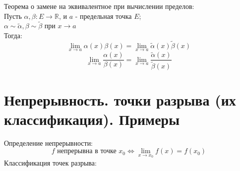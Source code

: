 \documentclass[11pt, a4paper]{article}
\def\R{\mathbb{R}}
\begin{document}
    Теорема о замене на эквивалентное при вычислении пределов:\\
    Пусть $\alpha , \beta : E \to \R$, и $a$ - предельная точка $E$;\\
    $\alpha \sim \tilde{\alpha}, \beta \sim \tilde{\beta}$ при $x \to a$\\
    Тогда:
    $$\lim_{x \to a} \alpha (x) \beta (x) = \lim_{x \to a} \tilde{\alpha} (x) \tilde{\beta} (x)$$
    $$\lim_{x \to a} \frac{\alpha (x)}{\beta (x)} = \lim_{x \to a} \frac{\tilde{\alpha} (x)}{\tilde{\beta} (x)}$$

    \section{Непрерывность. точки разрыва (их классификация). Примеры}
    Определение непрерывности:
    $$f \text{ непрерывна в точке } x_0 \Leftrightarrow \lim_{x \to x_0} f(x) = f(x_0)$$
    Классификация точек разрыва:
\end{document}

